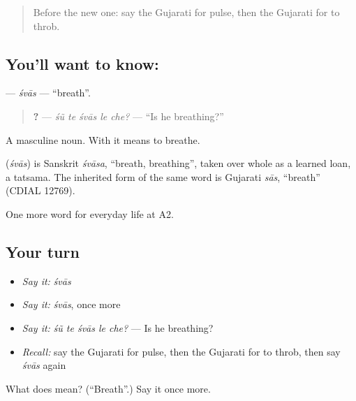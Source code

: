 \label{lesson:GU-C224-shvas}



\begin{quote}
Before the new one: say the Gujarati for pulse, then the Gujarati for to throb.
\end{quote}

\subsection*{You'll want to know: }
\textbf{} — \emph{śvās} — \textquotedblleft{}breath\textquotedblright{}.

\begin{quote}
\textbf{    ?} — \emph{śũ te śvās le che?} — \textquotedblleft{}Is he breathing?\textquotedblright{}
\end{quote}

A masculine noun. With \textbf{} it means to breathe.

\begin{cousinweb}
\textbf{} (\emph{śvās}) is Sanskrit \emph{śvāsa}, \textquotedblleft{}breath, breathing\textquotedblright{}, taken over whole as a learned loan, a tatsama. The inherited form of the same word is Gujarati \emph{sās}, \textquotedblleft{}breath\textquotedblright{} (CDIAL 12769).
\end{cousinweb}

\begin{grammarlens}[title={What you've built}]
One more word for everyday life at A2.
\end{grammarlens}

\subsection*{Your turn}
\begin{itemize}
\raggedright
  \item \emph{Say it:} \emph{śvās}
  \item \emph{Say it:} \emph{śvās}, once more
  \item \emph{Say it:} \emph{śũ te śvās le che?} — Is he breathing?
  \item \emph{Recall:} say the Gujarati for pulse, then the Gujarati for to throb, then say \emph{śvās} again
\end{itemize}

\begin{tcolorbox}[breakable,colback=teal!4,colframe=teal!35!black,title={Before you move on}]
What does  mean? (\textquotedblleft{}Breath\textquotedblright{}.) Say it once more.
\end{tcolorbox}
